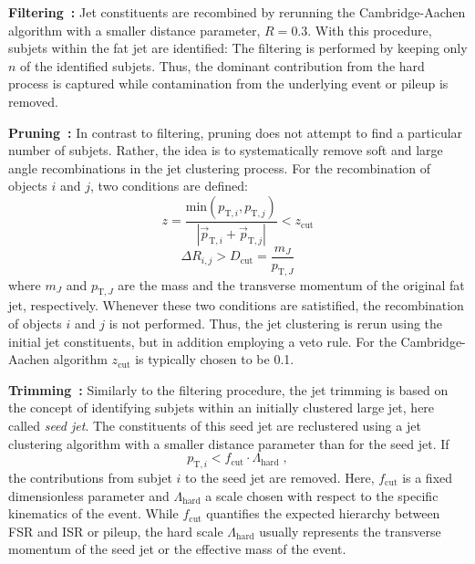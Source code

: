 \begin{description}
 \item \textbf{Filtering~\cite{Butterworth:2008tr}:} Jet constituents are recombined by rerunning the Cambridge-Aachen algorithm with a smaller distance parameter, \eg $R = 0.3$. With this procedure, subjets within the fat jet are identified: The filtering is performed by keeping only $n$ of the identified subjets. Thus, the dominant contribution from the hard process is captured while contamination from the underlying event or pileup is removed.
 \item \textbf{Pruning~\cite{Ellis:2009su}:} In contrast to filtering, pruning does not attempt to find a particular number of subjets. Rather, the idea is to systematically remove soft and large angle recombinations in the jet clustering process. For the recombination of objects $i$ and $j$, two conditions are defined:
\begin{equation*}
z = \frac{\mathrm{min}(p_{\mathrm{T},i}, p_{\mathrm{T},j})}{|\vec{p}_{\mathrm{T},i} + \vec{p}_{\mathrm{T},j}|} < z_\mathrm{cut}
\end{equation*}
\begin{equation*}
\Delta R_{i,j} > D_\mathrm{cut} = \frac{m_{J}}{p_{\mathrm{T}, J}}
\end{equation*}
where $m_{J}$ and $p_{\mathrm{T}, J}$ are the mass and the transverse momentum of the original fat jet, respectively. Whenever these two conditions are satistified, the recombination of objects $i$ and $j$ is not performed. Thus, the jet clustering is rerun using the initial jet constituents, but in addition employing a veto rule. For the Cambridge-Aachen algorithm $z_\mathrm{cut}$ is typically chosen to be 0.1.
 \item \textbf{Trimming~\cite{Krohn:2009th}:} Similarly to the filtering procedure, the jet trimming is based on the concept of identifying subjets within an initially clustered large jet, here called \textit{seed jet}. The constituents of this seed jet are reclustered using a jet clustering algorithm with a smaller distance parameter than for the seed jet. If 
\begin{equation*}
p_{\mathrm{T},i} < f_{\mathrm{cut}} \cdot \Lambda_{\mathrm{hard}} \; ,
\end{equation*}
the contributions from subjet $i$ to the seed jet are removed. Here, $f_{\mathrm{cut}}$ is a fixed dimensionless parameter and $\Lambda_{\mathrm{hard}}$ a scale chosen with respect to the specific kinematics of the event. While $f_{\mathrm{cut}}$ quantifies the expected hierarchy between FSR and ISR or pileup, the hard scale $\Lambda_{\mathrm{hard}}$ usually represents the transverse momentum of the seed jet or the effective mass of the event.%
\end{description} 
